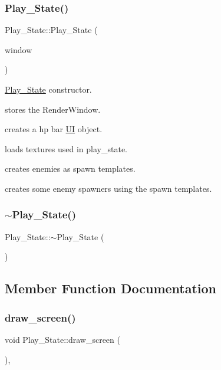 \subsubsection{\texorpdfstring{Play\+\_\+\+State()}{Play\_State()}}
{\footnotesize\ttfamily Play\+\_\+\+State\+::\+Play\+\_\+\+State (\begin{DoxyParamCaption}\item[{sf\+::\+Render\+Window $\ast$}]{window }\end{DoxyParamCaption})}

\hyperlink{classPlay__State}{Play\+\_\+\+State} constructor.
\begin{DoxyItemize}
\item stores the Render\+Window.
\item creates a hp bar \hyperlink{classUI}{UI} object.
\item loads textures used in play\+\_\+state.
\item creates enemies as spawn templates.
\item creates some enemy spawners using the spawn templates. 
\end{DoxyItemize}\mbox{\label{classPlay__State_a681fbcf9f02496c3d021762fe4a59341}} 
\subsubsection{\texorpdfstring{$\sim$\+Play\+\_\+\+State()}{~Play\_State()}}
{\footnotesize\ttfamily Play\+\_\+\+State\+::$\sim$\+Play\+\_\+\+State (\begin{DoxyParamCaption}{ }\end{DoxyParamCaption})}



\subsection{Member Function Documentation}
\mbox{\label{classPlay__State_a77ed7569adc8ab55ef2f6645cbdc94cf}} 
\subsubsection{\texorpdfstring{draw\+\_\+screen()}{draw\_screen()}}
{\footnotesize\ttfamily void Play\+\_\+\+State\+::draw\+\_\+screen (\begin{DoxyParamCaption}{ }\end{DoxyParamCaption})\hspace{0.3cm}{\ttfamily [override]}, {\ttfamily [virtual]}}

